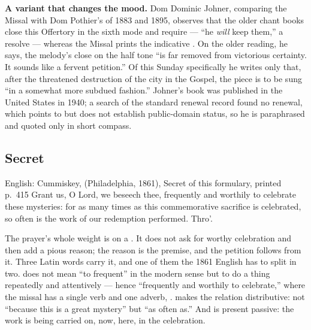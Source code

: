 \textbf{A variant that changes the mood.} Dom Dominic Johner, comparing the
Missal with Dom Pothier's  of 1883 and 1895, observes
that the older chant books close this Offertory in the sixth mode and require
 --- ``he \textit{will} keep them,'' a resolve --- whereas the
Missal prints the indicative . On the older reading, he says,
the melody's close on the half tone ``is far removed from victorious
certainty. It sounds like a fervent petition.'' Of this Sunday specifically he
writes only that, after the threatened destruction of the city in the Gospel,
the piece is to be sung ``in a somewhat more subdued fashion.''
Johner's book was published in the United States in 1940; a search of the standard renewal record found no renewal, which points
to but does not establish public-domain status, so he is paraphrased and
quoted only in short compass.

\elementguard
\subsection*{Secret }


\begin{namedtranslation}{English: Cummiskey,  (Philadelphia, 1861), Secret of this formulary, printed p.~415}
Grant us, O Lord, we beseech thee, frequently and worthily to celebrate these
mysteries: for as many times as this commemorative sacrifice is celebrated, so
often is the work of our redemption performed. Thro'.
\end{namedtranslation}

The prayer's whole weight is on a . It does not ask for worthy
celebration and then add a pious reason; the reason is the premise, and the
petition follows from it. Three Latin words carry it, and one of them the 1861
English has to split in two.  does not mean ``to frequent''
in the modern sense but to do a thing repeatedly and attentively --- hence
``frequently and worthily to celebrate,'' where the missal has a single verb
and one adverb, .  makes the relation
distributive: not ``because this is a great mystery'' but ``as often as.'' And
 is present passive: the work is being carried on, now, here,
in the celebration.

